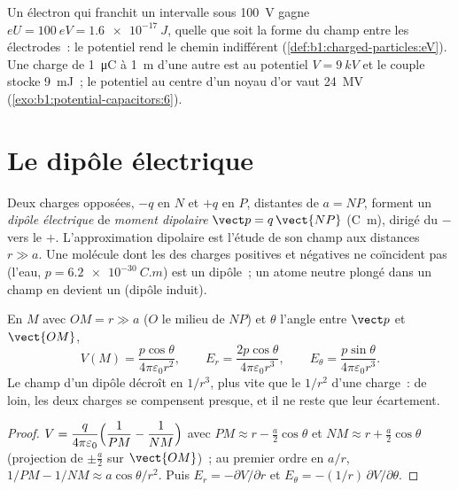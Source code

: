 \begin{example}\label{ex:b1:potential-capacitors:eV}
Un électron qui franchit un intervalle sous \qty{100}{V} gagne $eU = \qty{100}{eV} =
\qty{1.6e-17}{J}$, quelle que soit la forme du champ entre les électrodes~: le
potentiel rend le chemin indifférent
(\cref{def:b1:charged-particles:eV}). Une charge de \qty{1}{\micro C} à
\qty{1}{m} d'une autre est au potentiel $V = \qty{9}{kV}$ et le couple stocke
\qty{9}{mJ}~; le potentiel au centre d'un noyau d'or vaut
\qty{24}{MV} (\cref{exo:b1:potential-capacitors:6}).
\end{example}

\section{Le dipôle électrique}

\begin{definition}\label{def:b1:potential-capacitors:dipole}
Deux charges opposées, $-q$ en $N$ et $+q$ en $P$, distantes de $a = NP$,
forment un \emph{dipôle électrique} de \emph{moment dipolaire}
$\vect p = q\,\vect{NP}$ (\unit{C.m}), dirigé du $-$ vers le $+$.
L'approximation dipolaire est l'étude de son champ aux distances $r \gg a$.
Une molécule dont les  des charges positives et négatives ne
coïncident pas (l'eau, $p = \qty{6.2e-30}{C.m}$) est un dipôle~; un atome
neutre plongé dans un champ en devient un (dipôle induit).
\end{definition}

\begin{proposition}\label{prop:b1:potential-capacitors:dipolefield}
En $M$ avec $OM = r \gg a$ ($O$ le milieu de $NP$) et $\theta$ l'angle entre
$\vect p$ et $\vect{OM}$,
\[
V(M) = \frac{p\cos\theta}{4\pi\varepsilon_0 r^2}, \qquad
E_r = \frac{2p\cos\theta}{4\pi\varepsilon_0r^3}, \qquad
E_\theta = \frac{p\sin\theta}{4\pi\varepsilon_0r^3} .
\]
Le champ d'un dipôle décroît en $1/r^3$, plus vite que le
$1/r^2$ d'une charge~: de loin, les deux charges se compensent presque, et il
ne reste que leur écartement.
\end{proposition}

\begin{proof}
$V = \dfrac{q}{4\pi\varepsilon_0}\Bigl(\dfrac1{PM} - \dfrac1{NM}\Bigr)$ avec
$PM \approx r - \tfrac a2\cos\theta$ et $NM \approx r + \tfrac a2\cos\theta$
(projection de $\pm\tfrac a2$ sur $\vect{OM}$)~; au premier ordre en $a/r$,
$1/PM - 1/NM \approx a\cos\theta/r^2$. Puis $E_r = -\partial V/\partial r$ et
$E_\theta = -(1/r)\,\partial V/\partial\theta$.
\end{proof}

